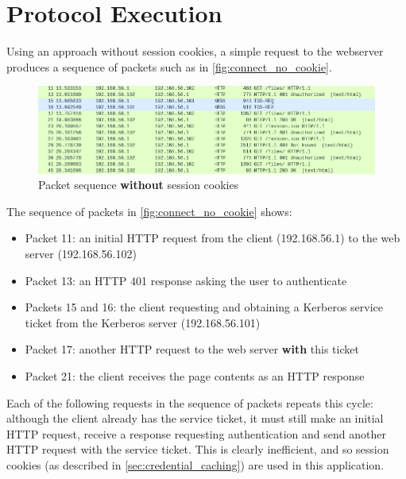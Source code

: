 \documentclass[12pt]{report}
\begin{document}

\section{Protocol Execution}
\label{sec:protocol_execution}
Using an approach without session cookies, a simple request to the webserver produces a sequence of packets such as in \autoref{fig:connect_no_cookie}.

\begin{figure}[ht]
  \begin{center}
    \includegraphics[width=\textwidth]{09-connect-no-cookie.png}
  \end{center}
  \caption{Packet sequence \textbf{without} session cookies}
  \label{fig:connect_no_cookie}
\end{figure}

The sequence of packets in \autoref{fig:connect_no_cookie} shows:

\begin{itemize}
\item
  Packet 11: an initial HTTP request from the client (192.168.56.1) to the web server (192.168.56.102)
\item
  Packet 13: an HTTP 401 response asking the user to authenticate
\item
  Packets 15 and 16: the client requesting and obtaining a Kerberos service ticket from the Kerberos server (192.168.56.101)
\item
  Packet 17: another HTTP request to the web server \textbf{with} this ticket
\item
  Packet 21: the client receives the page contents as an HTTP response
\end{itemize}

Each of the following requests in the sequence of packets repeats this cycle: although the client already has the service ticket, it must still make an initial HTTP request, receive a response requesting authentication and send another HTTP request with the service ticket. This is clearly inefficient, and so session cookies (as described in \autoref{sec:credential_caching}) are used in this application.
\end{document}
